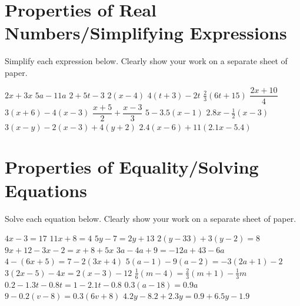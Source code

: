 \section*{Properties of Real Numbers/Simplifying Expressions}
Simplify each expression below. Clearly show your work on a separate sheet of paper.
\begin{smenum}
\mitemxxx
{$2x+3x$}
{$5a-11a$}
{$2+5t-3$}
\mitemxxxx
{$2(x-4)$}
{$4(t+3)-2t$}
{$\frac{2}{3}(6t+15)$}
{$\dfrac{2x+10}{4}$}
\mitemxxxx
{$3(x+6)-4(x-3)$}
{$\dfrac{x+5}{2}+\dfrac{x-3}{3}$}
{$5-3.5(x-1)$}
{$2.8x-\frac{1}{2}(x-3)$}
\mitemxx
{$3(x-y)-2(x-3)+4(y+2)$}
{$2.4(x-6)+11(2.1x-5.4)$}
\end{smenum}

\section*{Properties of Equality/Solving Equations}
Solve each equation below. Clearly show your work on a separate sheet of paper.
\begin{smenum}
\mitemxx
{$4x-3=17$}
{$11x+8=4$}
\mitemxx
{$5y-7=2y+13$}
{$2(y-33)+3(y-2)=8$}
\mitemxx
{$9x+12-3x-2=x+8+5x$}
{$3a-4a+9=-12a+43-6a$}
\mitemxx
{$4-(6x+5)=7-2(3x+4)$}
{$5(a-1)-9(a-2)=-3(2a+1)-2$}
\mitemxx
{$3(2x-5)-4x=2(x-3)-12$}
{$\frac{1}{6}(m-4)=\frac{2}{3}(m+1)-\frac{1}{3}m$}
\mitemxx
{$0.2-1.3t-0.8t=1-2.1t-0.8$}
{$0.3(a-18)=0.9a$}
\mitemxx
{$9-0.2(v-8)=0.3(6v+8)$}
{$4.2y-8.2+2.3y=0.9+6.5y-1.9$}
\end{smenum}

